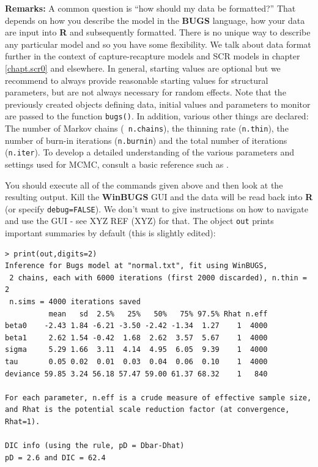 {\bf Remarks:} A common question is ``how should my data be
formatted?'' That depends on how you describe the model in the {\bf
  BUGS} language, how your data are input into {\bf R} and
subsequently formatted.  There is no unique way to describe any
particular model and so you have some flexibility. We talk about data
format further in the context of capture-recapture models and SCR
models in chapter \ref{chapt.scr0} and elsewhere.  In general,
starting values are optional but we recommend to always provide
reasonable starting values for structural parameters, but are not
always necessary for random effects.  Note that the previously created
objects defining data, initial values and parameters to monitor are
passed to the function \mbox{\tt bugs()}.  In addition, various other
things are declared: The number of Markov chains (\mbox{\tt
  n.chains}), the thinning rate (\mbox{\tt n.thin}),
the number of burn-in iterations (\mbox{\tt n.burnin}) and the total
number of iterations
(\mbox{\tt n.iter}).
To develop a detailed understanding of the various parameters and
settings used for MCMC, consult a basic reference such as
\citet{kery:2010}.



You should execute all of the commands given above and then look at
the resulting output. Kill the {\bf WinBUGS} GUI and the data will be
read back into {\bf R} (or specify \mbox{\tt debug=FALSE}).  We don't
want to give instructions on how to navigate and use the GUI - see XYZ
REF (XYZ) for that.  
The object \mbox{\tt out} prints important
summaries by default (this is slightly edited):

{\small
\begin{verbatim}
> print(out,digits=2)
Inference for Bugs model at "normal.txt", fit using WinBUGS,
 2 chains, each with 6000 iterations (first 2000 discarded), n.thin = 2
 n.sims = 4000 iterations saved
          mean   sd  2.5%   25%   50%   75% 97.5% Rhat n.eff
beta0    -2.43 1.84 -6.21 -3.50 -2.42 -1.34  1.27    1  4000
beta1     2.62 1.54 -0.42  1.68  2.62  3.57  5.67    1  4000
sigma     5.29 1.66  3.11  4.14  4.95  6.05  9.39    1  4000
tau       0.05 0.02  0.01  0.03  0.04  0.06  0.10    1  4000
deviance 59.85 3.24 56.18 57.47 59.00 61.37 68.32    1   840

For each parameter, n.eff is a crude measure of effective sample size,
and Rhat is the potential scale reduction factor (at convergence, Rhat=1).

DIC info (using the rule, pD = Dbar-Dhat)
pD = 2.6 and DIC = 62.4
\end{verbatim}
}


